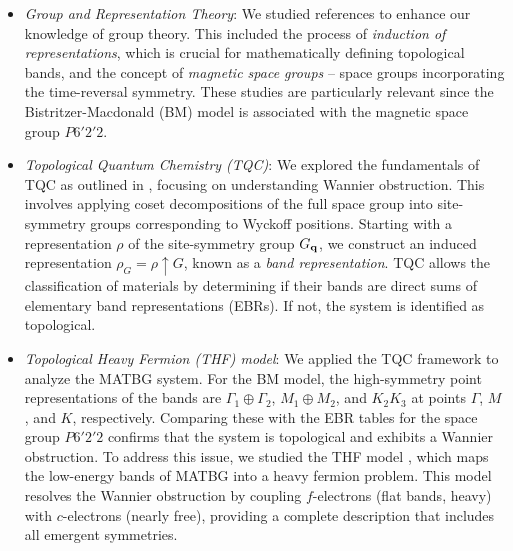 \documentclass[12pt]{report}
\begin{document}
\begin{itemize}
\item \textit{Group and Representation Theory}:
We studied references \cite{dresselhaus, evarestov, barata_representacoes, magnetic_structures2012, michael_glazer2012_space_groups, thesis_rennella} to enhance our knowledge of group theory. This included the process of \textit{induction of representations}, which is crucial for mathematically defining topological bands, and the concept of \textit{magnetic space groups} -- space groups incorporating the time-reversal symmetry. These studies are particularly relevant since the Bistritzer-Macdonald (BM) model is associated with the magnetic space group \( P6'2'2 \).

\item \textit{Topological Quantum Chemistry (TQC)}:
We explored the fundamentals of TQC as outlined in \cite{topological_quantum_chemistry2017, building_blocks2018, lectures_tms2017}, focusing on understanding Wannier obstruction. This involves applying coset decompositions of the full space group into site-symmetry groups corresponding to Wyckoff positions. Starting with a representation \( \rho \) of the site-symmetry group \( G_{\vb{q}} \), we construct an induced representation \( \rho_G = \rho \uparrow G \), known as a \textit{band representation}. TQC allows the classification of materials by determining if their bands are direct sums of elementary band representations (EBRs). If not, the system is identified as topological.

\item \textit{Topological Heavy Fermion (THF) model}:
We applied the TQC framework to analyze the MATBG system. For the BM model, the high-symmetry point representations of the bands are \( \Gamma_1 \oplus \Gamma_2 \), \( M_1 \oplus M_2 \), and \( K_2 K_3 \) \cite{all_magic_angles, bernevig_II_2021} at points \( \Gamma \), \( M \), and \( K \), respectively. Comparing these with the EBR tables for the space group \( P6'2'2 \) confirms that the system is topological and exhibits a Wannier obstruction. To address this issue, we studied the THF model \cite{topoheavyfermion2022}, which maps the low-energy bands of MATBG into a heavy fermion problem. This model resolves the Wannier obstruction by coupling \( f \)-electrons (flat bands, heavy) with \( c \)-electrons (nearly free), providing a complete description that includes all emergent symmetries.
\end{itemize}

\end{document}

